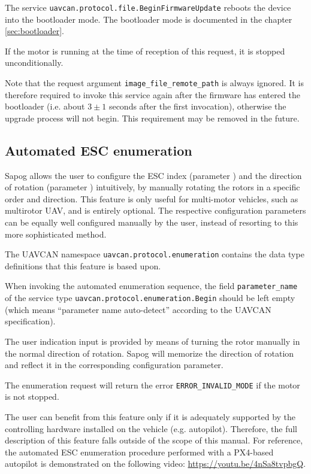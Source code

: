 \documentclass{zubaxdoc}
\begin{document}
The service \verb|uavcan.protocol.file.BeginFirmwareUpdate| reboots the device into the bootloader
mode.
The bootloader mode is documented in the chapter \ref{sec:bootloader}.

If the motor is running at the time of reception of this request, it is stopped unconditionally.

Note that the request argument \verb|image_file_remote_path| is always ignored.
It is therefore required to invoke this service again after the firmware has entered the bootloader
(i.e. about $3\pm{}1$ seconds after the first invocation),
otherwise the upgrade process will not begin.
This requirement may be removed in the future.

\subsection{Automated ESC enumeration}

Sapog allows the user to configure the ESC index (parameter )
and the direction of rotation (parameter ) intuitively,
by manually rotating the rotors in a specific order and direction.
This feature is only useful for multi-motor vehicles, such as multirotor UAV,
and is entirely optional.
The respective configuration parameters can be equally well configured manually
by the user, instead of resorting to this more sophisticated method.

The UAVCAN namespace \verb|uavcan.protocol.enumeration| contains the data type definitions that
this feature is based upon.

When invoking the automated enumeration sequence, the field \verb|parameter_name|
of the service type \verb|uavcan.protocol.enumeration.Begin| should be left empty
(which means ``parameter name auto-detect'' according to the UAVCAN specification).

The user indication input is provided by means of turning the rotor manually in the normal
direction of rotation.
Sapog will memorize the direction of rotation and reflect it in the corresponding configuration
parameter.

The enumeration request will return the error \verb|ERROR_INVALID_MODE| if the motor is not stopped.

The user can benefit from this feature only if it is adequately supported by the
controlling hardware installed on the vehicle (e.g. autopilot).
Therefore, the full description of this feature falls outside of the scope of this
manual.
For reference, the automated ESC enumeration procedure performed with a PX4-based autopilot
is demonstrated on the following video: \url{https://youtu.be/4nSa8tvpbgQ}.
\end{document}
